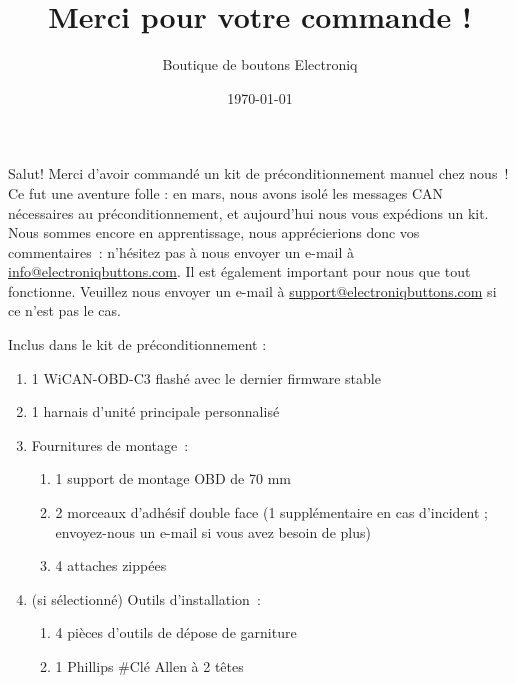 \documentclass[superscriptaddress,onecolumn,floatfix]{revtex4-2}
\makeatletter
\DeclareRobustCommand{\selectlanguage}[1]{%
    \@ifundefined{alias@\string#1}
      {\ORIGselectlanguage{#1}}
      {\begingroup\edef\x{\endgroup
         \noexpand\ORIGselectlanguage{\@nameuse{alias@#1}}}\x}%
}
\makeatother
\begin{document}
\selectlanguage{fr}

\title{Merci pour votre commande !}
\author{Boutique de boutons Electroniq}
\date{\today}

\maketitle

Salut! Merci d'avoir commandé un kit de préconditionnement manuel chez nous ! Ce fut une aventure folle : en mars, nous avons isolé les messages CAN nécessaires au préconditionnement, et aujourd'hui nous vous expédions un kit. Nous sommes encore en apprentissage, nous apprécierions donc vos commentaires : n'hésitez pas à nous envoyer un e-mail à \href{mailto:info@electroniqbuttons.com}{info@electroniqbuttons.com}. Il est également important pour nous que tout fonctionne. Veuillez nous envoyer un e-mail à \href{mailto:support@electroniqbuttons.com}{support@electroniqbuttons.com} si ce n'est pas le cas. 

Inclus dans le kit de préconditionnement :
{\small
\begin{enumerate}
  \item 1 WiCAN-OBD-C3 flashé avec le dernier firmware stable
  \item 1 harnais d'unité principale personnalisé
  \item Fournitures de montage : 
    \begin{enumerate}
      \item 1 support de montage OBD de 70 mm
      \item 2 morceaux d'adhésif double face (1 supplémentaire en cas d'incident ; envoyez-nous un e-mail si vous avez besoin de plus)
      \item 4 attaches zippées
    \end{enumerate}
  \item (si sélectionné) Outils d'installation :
    \begin{enumerate}
      \item 4 pièces d'outils de dépose de garniture
      \item 1 Phillips \#Clé Allen à 2 têtes
    \end{enumerate}
\end{enumerate}
}
\end{document}

